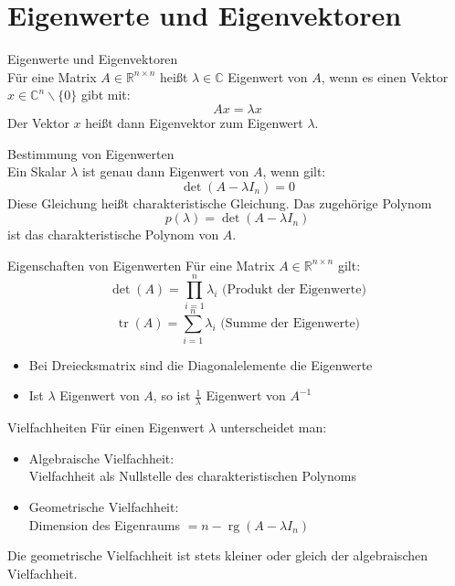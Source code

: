 \section{Eigenwerte und Eigenvektoren}

\begin{definition}{Eigenwerte und Eigenvektoren}\\
Für eine Matrix $A \in \mathbb{R}^{n\times n}$ heißt $\lambda \in \mathbb{C}$ Eigenwert von $A$, wenn es einen Vektor $x \in \mathbb{C}^n \backslash \{0\}$ gibt mit:
\vspace{-2mm}\\
$$Ax = \lambda x$$
Der Vektor $x$ heißt dann Eigenvektor zum Eigenwert $\lambda$.
\end{definition}

\begin{concept}{Bestimmung von Eigenwerten}\\
Ein Skalar $\lambda$ ist genau dann Eigenwert von $A$, wenn gilt:
\vspace{-2mm}\\
$$\det(A - \lambda I_n) = 0$$
Diese Gleichung heißt charakteristische Gleichung. Das zugehörige Polynom
\vspace{-2mm}
$$p(\lambda) = \det(A - \lambda I_n)$$
ist das charakteristische Polynom von $A$.
\end{concept}

\begin{theorem}{Eigenschaften von Eigenwerten}
Für eine Matrix $A \in \mathbb{R}^{n\times n}$ gilt:
$$\det(A) = \prod_{i=1}^n \lambda_i \text{ (Produkt der Eigenwerte)}$$
$$\operatorname{tr}(A) = \sum_{i=1}^n \lambda_i \text{ (Summe der Eigenwerte)}$$
\begin{itemize}
    \item Bei Dreiecksmatrix sind die Diagonalelemente die Eigenwerte
    \item Ist $\lambda$ Eigenwert von $A$, so ist $\frac{1}{\lambda}$ Eigenwert von $A^{-1}$
\end{itemize}
\end{theorem}

\begin{concept}{Vielfachheiten}
Für einen Eigenwert $\lambda$ unterscheidet man:
\begin{itemize}
    \item Algebraische Vielfachheit: \\Vielfachheit als Nullstelle des charakteristischen Polynoms
    \item Geometrische Vielfachheit: \\Dimension des Eigenraums $= n - \operatorname{rg}(A-\lambda I_n)$
\end{itemize}
Die geometrische Vielfachheit ist stets kleiner oder gleich der algebraischen Vielfachheit.
\end{concept}

